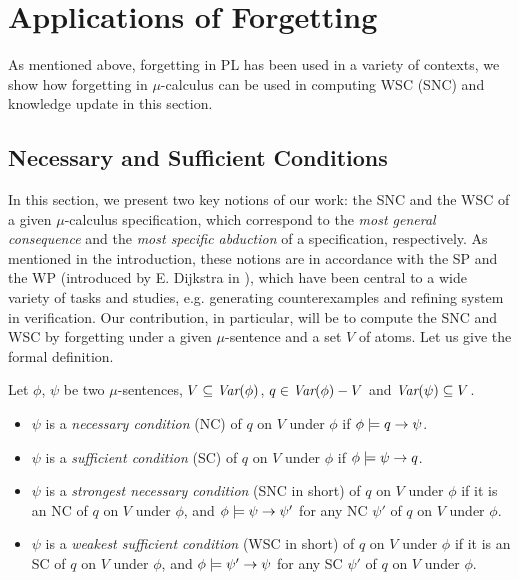 \documentclass[runningheads]{llncs}
\begin{document}
\section{Applications of Forgetting}\label{applications}
As mentioned above, forgetting in PL has been used in a variety of contexts, we show how forgetting in $\mu$-calculus can be used in computing WSC (SNC) and knowledge update in this section.

\subsection{Necessary and Sufficient Conditions}\label{ns_conditions}
In this section, we present two key notions of our work:  the SNC and the WSC  of a given $\mu$-calculus specification, which correspond to the \emph{most general consequence} and the \emph{most specific abduction} of a specification, respectively.  As mentioned in the introduction, these notions are in accordance with the SP and the WP (introduced by E. Dijkstra in \cite{DBLP:journals/cacm/Dijkstra75}), which have been central to a wide variety of tasks and studies, e.g. generating counterexamples and refining system in verification. Our contribution, in particular, will be to compute the SNC and WSC by forgetting under a given $\mu$-sentence and a set $V$ of atoms.  Let us give the formal definition.

\begin{definition}\label{def:NC:SC}
Let $\phi$, $\psi$ be two $\mu$-sentences, $V \subseteq \textit{Var}(\phi)$, $q\in\textit{Var}(\phi)- V$
and $\textit{Var}(\psi)\subseteq V$.
\begin{itemize}
  \item $\psi$  is a {\em necessary condition} (NC) of $q$ on $V$ under $\phi$
    if $\phi \models q \rightarrow \psi$.
  \item $\psi$  is a {\em sufficient condition} (SC) of $q$ on $V$ under $\phi$
    if $\phi \models \psi\rightarrow q$.
  \item $\psi$  is a {\em strongest necessary condition} (SNC in short)
  of $q$ on $V$ under $\phi$
    if it is an NC of $q$ on $V$ under $\phi$, and $\phi\models\psi\rightarrow\psi'$
    for any NC $\psi'$ of $q$ on $V$ under $\phi$.

    \item $\psi$  is a {\em weakest sufficient condition} (WSC in short)
  of $q$ on $V$ under $\phi$
    if it is an SC of $q$ on $V$ under $\phi$, and $\phi\models\psi'\rightarrow\psi$
    for any SC $\psi'$ of $q$ on $V$ under $\phi$.
\end{itemize}
\end{definition}
\end{document}
